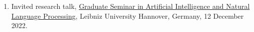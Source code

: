 
\begin{enumerate}
\item Invited research talk, \href{https://www.ai.uni-hannover.de/en/teaching/seminars/ai-nlp}{Graduate Seminar in Artificial Intelligence and Natural Language Processing}, Leibniz University Hannover, Germany, 12 December 2022.
\end{enumerate}
